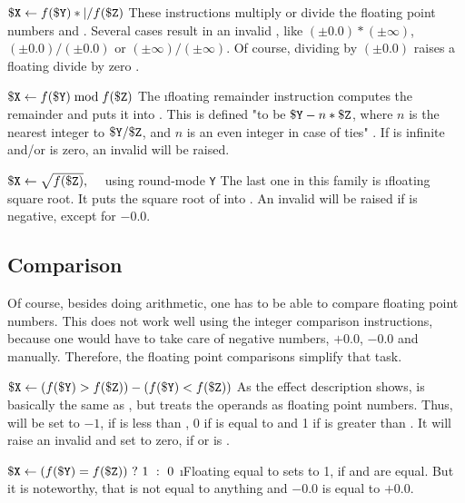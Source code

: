 \instrtbl
	{}
	{${\tt \$X} \leftarrow f({\tt \$Y}) *|/ f({\tt \$Z})$}
\noindent These instructions multiply or divide the floating point numbers  and . Several cases result in an invalid , like $(\pm 0.0)*(\pm \infty)$, $(\pm 0.0)/(\pm 0.0)$ or $(\pm \infty)/(\pm \infty)$. Of course, dividing by $(\pm 0.0)$ raises a floating divide by zero . \citep[pg. 16]{mmix-doc}

\instrtbl
	{}
	{${\tt \$X} \leftarrow f({\tt \$Y}) \bmod f({\tt \$Z})$}
\noindent The \i{floating remainder} instruction computes the remainder and puts it into . This is defined "to be ${\tt \$Y} - n * {\tt \$Z}$, where $n$ is the nearest integer to ${\tt \$Y}/{\tt \$Z}$, and $n$ is an even integer in case of ties" \citep[pg. 16]{mmix-doc}. If  is infinite and/or  is zero, an invalid  will be raised. \citep[pg. 16]{mmix-doc}

\instrtbl
	{}
	{${\tt \$X} \leftarrow \sqrt{f({\tt \$Z})},\quad$ using round-mode {\tt Y}}
\noindent The last one in this family is \i{floating square root}. It puts the square root of  into . An invalid  will be raised if  is negative, except for $-0.0$. \citep[pg. 17]{mmix-doc}

\subsection{Comparison}

Of course, besides doing arithmetic, one has to be able to compare floating point numbers. This does not work well using the integer comparison instructions, because one would have to take care of negative numbers, $+0.0$, $-0.0$ and \NaN manually. Therefore, the floating point comparisons simplify that task.

\instrtbl
	{}
	{${\tt \$X} \leftarrow (f({\tt \$Y}) > f({\tt \$Z})) - (f({\tt \$Y}) < f({\tt \$Z}))$}
\noindent As the effect description shows,  is basically the same as , but treats the operands as floating point numbers. Thus,  will be set to $-1$, if  is less than , 0 if  is equal to  and 1 if  is greater than . It will raise an invalid  and set  to zero, if  or  is \NaN. \citep[pg. 17]{mmix-doc}

\instrtbl
	{}
	{${\tt \$X} \leftarrow (f({\tt \$Y}) = f({\tt \$Z}))~?~1~:~0$}
\noindent \i{Floating equal to} sets  to 1, if  and  are equal. But it is noteworthy, that \NaN is not equal to anything and $-0.0$ is equal to $+0.0$. \citep[pg. 17]{mmix-doc}

